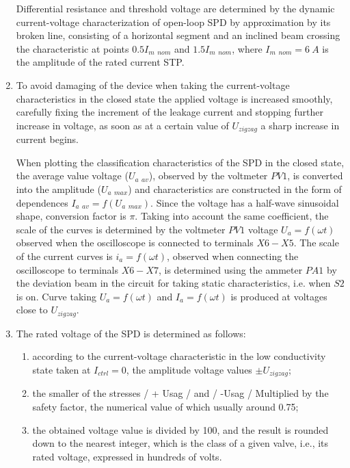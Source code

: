 \documentclass[a4paper,14pt]{article}
\begin{document}
\begin{enumerate}
Differential resistance and threshold voltage are determined by the dynamic current-voltage
characterization of open-loop SPD by approximation by its broken line, consisting of
a horizontal segment and an inclined beam crossing the characteristic at points $0.5 I_{m\:\: nom}$ and 
$1.5 I_{m\:\: nom}$,
where $I_{m\:\: nom} = 6\: A$ is the amplitude of the rated current STP.

\item To avoid damaging of the device when taking the current-voltage characteristics in the closed state
the applied voltage is increased smoothly, carefully fixing the increment of the leakage current and stopping
further increase in voltage, as soon as at a certain value of $U_{zigzag}$
a sharp increase in current begins.

When plotting the classification characteristics of the SPD in the closed state, the average value
voltage ($U_{a\:\:av}$), observed by the voltmeter $PV1$, is converted into the amplitude ($U_{a\:\: max}$)
 and characteristics
are constructed in the form of dependences $I_{a\:\:av} = f(U_{a\:\:max})$. 
Since the voltage has a half-wave sinusoidal shape,
conversion factor is $\pi$. Taking into account the same coefficient, 
the scale of the curves is determined by the voltmeter $PV1$
voltage $U_a = f (\omega t)$ observed when the oscilloscope is connected to terminals $X6-X5$. 
The scale of the current curves is $i_a = f (\omega t)$,
observed when connecting the oscilloscope to terminals $X6-X7$, is determined using the ammeter $PA1$ by the deviation
beam in the circuit for taking static characteristics, i.e. when $S2$ is on. Curve taking $U_a = f (\omega t)$ and
$I_a = f (\omega t)$ is produced at voltages close to $U_{zigzag}$.

\item The rated voltage of the SPD is determined as follows:

\begin{enumerate}
\item according to the current-voltage characteristic in the low conductivity state taken at $I_{ctrl} = 0$, 
the amplitude voltage values $\pm U_{zigzag}$;

\item the smaller of the stresses / + Usag / and / -Usag / Multiplied by the safety factor, the numerical value of which
usually around 0.75;

\item the obtained voltage value is divided by 100, and the result is rounded down to the nearest
integer, which is the class of a given valve, i.e., its rated voltage, expressed
in hundreds of volts.
\end{enumerate}


\end{enumerate}
\end{document}
